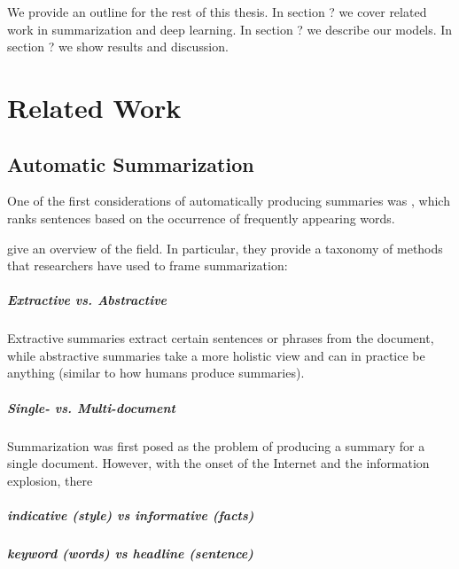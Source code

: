 \documentclass[11pt]{report}
\begin{document}
We provide an outline for the rest of this thesis.
In section ? we cover related work in summarization and deep learning.
In section ? we describe our models.
In section ? we show results and discussion.




\chapter{Related Work}

\section{Automatic Summarization}

One of the first considerations of automatically producing summaries was \cite{luhn1958automatic}, which ranks sentences based on the occurrence of frequently appearing words.


\citet{Nenkova2011} give an overview of the field. In particular, they provide a taxonomy of methods that researchers have used to frame summarization:

\paragraph{Extractive vs. Abstractive} Extractive summaries extract certain sentences or phrases from the document, while abstractive summaries take a more holistic view and can in practice be anything (similar to how humans produce summaries). 

\paragraph{Single- vs. Multi-document} Summarization was first posed as the problem of producing a summary for a single document. However, with the onset of the Internet and the information explosion, there 

\paragraph{indicative (style) vs informative (facts)} %

\paragraph{keyword (words) vs headline (sentence)} %
\end{document}
